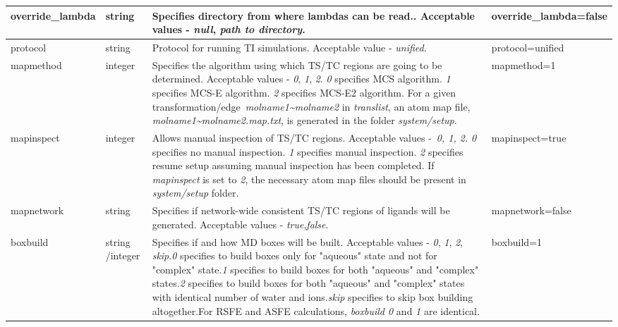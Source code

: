 \documentclass[11pt,letterpaper,titlepage]{article}
\begin{document}
\begin{footnotesize}
\begin{landscape}
\begin{center}
\begin{longtable}[1]{p{3cm}|p{0.5cm}|p{11cm}|p{4cm}}
\hline
override\_lambda	& string          & Specifies directory from where lambdas can be read.. Acceptable values - \textit{null}, \textit{path to directory}.   & override\_lambda=false   \\
\hline
protocol           & string          & Protocol for running TI simulations. Acceptable value - \textit{unified}.     & protocol=unified     \\ 
\hline
	mapmethod          & integer         & Specifies the algorithm using which TS/TC regions are going to be determined. Acceptable values - \textit{0}, \textit{1}, \textit{2}. \newline \textit{0} specifies MCS algorithm. \newline \textit{1} specifies MCS-E algorithm. \newline \textit{2} specifies MCS-E2 algorithm. \newline For a given transformation/edge~\textit{molname1\textasciitilde{}molname2} in \textit{translist}, an atom map file, \textit{molname1\textasciitilde{}molname2.map.txt}, is generated in the folder \textit{system/setup}.   & mapmethod=1      \\ 
\hline
	mapinspect         & integer         & Allows manual inspection of TS/TC regions. Acceptable values -~\textit{0, 1, 2.} \newline \textit{0} specifies no manual inspection. \newline\textit{1} specifies manual inspection. \newline \textit{2} specifies resume setup assuming manual inspection has been completed. \newline If \textit{mapinspect} is set to \textit{2}, the necessary atom map files should be present in \textit{system/setup} folder. & mapinspect=true \\
\hline
mapnetwork         & string          & Specifies if network-wide consistent TS/TC regions of ligands will be generated. Acceptable values - \textit{true},\textit{false}.    & mapnetwork=false     \\ 
\hline
boxbuild           & string /\newline integer  & Specifies if and how MD boxes will be built. Acceptable values - \textit{0}, \textit{1}, \textit{2}, \textit{skip}.\newline \textit{0} specifies to build boxes only for "aqueous" state and not for "complex" state.\newline \textit{1} specifies to build boxes for both "aqueous" and "complex" states.\newline \textit{2} specifies to build boxes for both "aqueous" and "complex" states with identical number of water and ions.\newline \textit{skip} specifies to skip box building altogether.\newline For RSFE and ASFE calculations, \textit{boxbuild 0} and \textit{1} are identical. & boxbuild=1   \\ 

\end{longtable}
\end{center}
\end{landscape}
\end{footnotesize}
\end{document}
